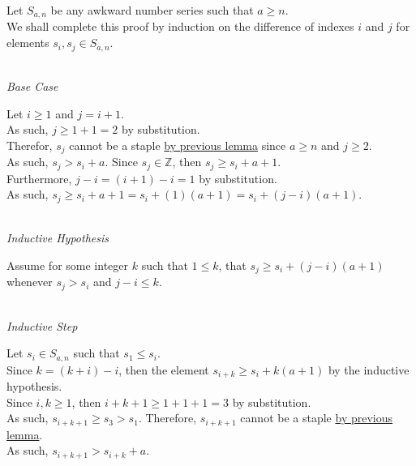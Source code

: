 \documentclass[a4paper,12pt]{article}
\begin{document}
\noindent Let $S_{a, n}$ be any awkward number series such that $a \geq n$.\\

\noindent We shall complete this proof by induction on the difference of indexes $i$ and $j$ for elements $s_i, s_j \in S_{a, n}$.

\noindent \\
\textit{Base Case}

\noindent Let $i \geq 1$ and $j = i + 1$.\\

\noindent As such, $j \geq 1 + 1 = 2$ by substitution.\\

\noindent Therefor, $s_j$ cannot be a staple \hyperlink{lemma:only_staple}{by previous lemma} since $a \geq n$ and $j \geq 2$.\\

\noindent As such, $s_j > s_i + a$. Since $s_j \in \mathbb{Z}$, then $s_j \geq s_i + a + 1$.\\

\noindent Furthermore, $j - i = (i + 1) - i = 1$ by substitution.\\

\noindent As such, $s_j \geq s_i + a + 1 = s_i + (1)(a + 1) = s_i + (j - i)(a + 1)$.


\noindent \\
\textit{Inductive Hypothesis}

\noindent Assume for some integer $k$ such that $1 \leq k$, that $s_j \geq s_i + (j - i)(a + 1)$ whenever $s_j > s_i$ and $j - i \leq k$.


\noindent \\
\textit{Inductive Step}

\noindent Let $s_i \in S_{a, n}$ such that $s_1 \leq s_i$.\\

\noindent Since $k = (k + i) - i$, then the element $s_{i + k} \geq s_i + k(a + 1)$ by the inductive hypothesis.\\

\noindent Since $i, k \geq 1$, then $i + k + 1 \geq 1 + 1 + 1 = 3$ by substitution.\\

\noindent As such, $s_{i + k + 1} \geq s_3 > s_1$. Therefore, $s_{i + k + 1}$ cannot be a staple \hyperlink{lemma:only_staple}{by previous lemma}.\\

\noindent As such, $s_{i + k + 1} > s_{i + k} + a$.\\
\end{document}
